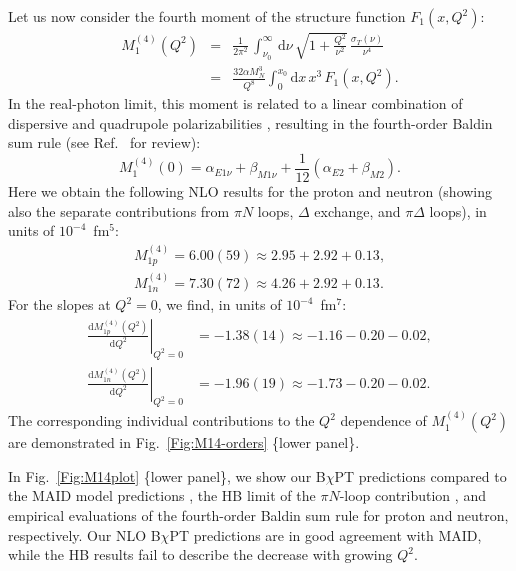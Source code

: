 \documentclass[12pt,preprint,tightenlines,
showpacs,preprintnumbers,amsmath,amssymb,
a4paper,nofootinbib]{revtex4-2}
\def\beq{\begin{equation}}
\def\eeq{\end{equation}}
\def\bea{\begin{eqnarray}}
\def\eea{\end{eqnarray}}
\def\al{\alpha}
\def\nn{\nonumber}
\def\dd{\mathrm{d}}
\begin{document}
Let us now consider the fourth moment of the structure function $F_1(x,Q^2)$:
\bea
 M_1^{(4)}(Q^2)&=& 
\frac{1}{2 \pi^2} \, \int_{\nu_0}^{\infty}\, \mathrm{d}\nu \,\sqrt{1+\frac{Q^2}{\nu^{2}}}\, \frac{\sigma_T(\nu)}{\nu^{4} }\\
&=&\frac{32 \al M_N^3}{Q^8}\int_0^{x_0}\!\dd x\, x^3 \,F_1(x,Q^2) \nn.
\eea
In the real-photon limit, this moment is related to a linear combination of dispersive and quadrupole polarizabilities \cite{Guiasu:1978dz,Holstein:1999uu}, resulting in the fourth-order Baldin sum rule (see Ref.~\cite{Hagelstein:2015egb} for review):
\beq
M_1^{(4)}(0)=\alpha_{E1 \nu} + \beta_{M1 \nu} + \frac{1}{12} (\alpha_{E2} + \beta_{M2}) .
\eeq
Here we obtain the following NLO results for the proton and neutron (showing also the separate contributions from $\pi N$ loops,  $\Delta$ exchange, and $\pi\Delta$ loops), in units of $10^{-4}$~fm$^5$:
\begin{subequations}
\begin{align}
M_{1p}^{(4)}=6.00(59)\approx2.95+2.92+0.13, \\
M_{1n}^{(4)}=7.30(72) \approx 4.26+2.92+0.13.
\end{align}
\end{subequations}
For the slopes at $Q^2=0$, we find, in units of $10^{-4}$~fm$^7$:
\begin{subequations}
\begin{align}
\left.\frac{\dd M_{1p}^{(4)} (Q^2)}{\dd Q^2}\right|_{Q^2=0}&=-1.38(14)\approx -1.16-0.20-0.02  ,  \\
\left.\frac{\dd M_{1n}^{(4)} (Q^2)}{\dd Q^2}\right|_{Q^2=0}&=-1.96(19) \approx -1.73-0.20-0.02.
\end{align}
\end{subequations}
 The corresponding individual contributions to the $Q^2$ dependence
of $M_1^{(4)}(Q^2)$ are demonstrated in Fig.~\ref{Fig:M14-orders} \{lower panel\}.


In Fig.~\ref{Fig:M14plot} \{lower panel\}, we show our B$\chi$PT predictions compared to the MAID model predictions \cite{Drechsel:2000ct,Drechsel:1998hk,private-Lothar},  the  HB limit  of  the $\pi N$-loop  contribution \cite{Nevado:2007dd}, and empirical evaluations of the fourth-order Baldin sum rule \cite{Gryniuk:2015aa,Schroder:1977sn} for proton and neutron, respectively. Our NLO B$\chi$PT predictions are in good agreement with MAID, while the HB results fail to describe the decrease with growing $Q^2$.
\end{document}

